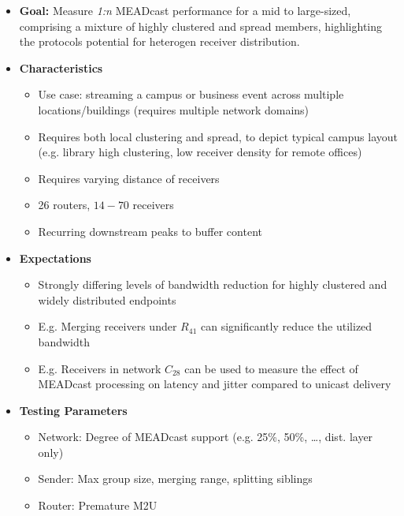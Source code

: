 \begin{itemize}\itemsep0em
    \item \textbf{Goal:} Measure \textit{1:n} MEADcast performance for a
        mid to large-sized, comprising a mixture of highly clustered and spread
        members, highlighting the protocols potential for heterogen receiver
        distribution.
    \item[] \textbf{Characteristics}
    \begin{itemize}\itemsep0em
        \item Use case: streaming a campus or business event across multiple
            locations/buildings (requires multiple network domains)
        \item Requires both local clustering and spread, to depict typical
            campus layout (e.g. library high clustering, low receiver density
            for remote offices)
        \item Requires varying distance of receivers
        \item 26 routers, $14-70$ receivers
        \item Recurring downstream peaks to buffer content
            \cite{cartesian_us_bw}
    \end{itemize}
    \item[] \textbf{Expectations}
    \begin{itemize}\itemsep0em
        \item Strongly differing levels of bandwidth reduction for highly
            clustered and widely distributed endpoints
        \item E.g. Merging receivers under $R_{41}$ can significantly reduce
            the utilized bandwidth 
        \item E.g. Receivers in network $C_{28}$ can be used to measure
            the effect of MEADcast processing on latency and jitter compared to
            unicast delivery
    \end{itemize}
    \item[] \textbf{Testing Parameters}
    \begin{itemize}\itemsep0em
            \item Network: Degree of MEADcast support (e.g. 25\%, 50\%, \dots,
                dist. layer only)
        \item Sender: Max group size, merging range, splitting siblings
        \item Router: Premature M2U
    \end{itemize}
\end{itemize}
\newpage


